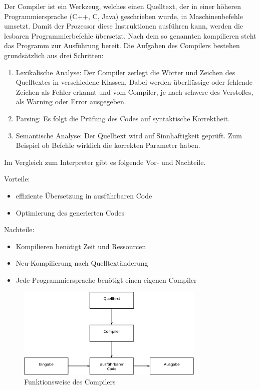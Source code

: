 Der Compiler ist ein Werkzeug, welches einen Quelltext, der in einer höheren Programmiersprache (C++, C, Java) geschrieben wurde, in Maschinenbefehle umsetzt. Damit der Prozessor diese Instruktionen ausführen kann, werden die lesbaren Programmierbefehle übersetzt. Nach dem so genannten kompilieren steht das Programm zur Ausführung bereit.
Die Aufgaben des Compilers bestehen grundsätzlich aus drei Schritten:\cite{compiler}
\begin{enumerate}
  \item Lexikalische Analyse:
  	Der Compiler zerlegt die Wörter und Zeichen des Quelltextes in verschiedene Klassen. Dabei werden überflüssige oder fehlende Zeichen als Fehler erkannt und vom Compiler, je nach
  schwere des Verstoßes, als Warning oder Error ausgegeben.
  \item Parsing:
  	Es folgt die Prüfung des Codes auf syntaktische Korrektheit.
  \item Semantische Analyse: Der Quelltext wird auf Sinnhaftigkeit geprüft. Zum Beispiel ob Befehle wirklich die korrekten Parameter haben.
\end{enumerate}

Im Vergleich zum Interpreter gibt es folgende Vor- und Nachteile.

Vorteile:
\begin{itemize}
  \item effiziente Übersetzung in ausführbaren Code
  \item Optimierung des generierten Codes
\end{itemize}

Nachteile:
\begin{itemize}
  \item Kompilieren benötigt Zeit und Ressourcen
  \item Neu-Kompilierung nach Quelltextänderung
  \item Jede Programmiersprache benötigt einen eigenen Compiler
\end{itemize}

\begin{figure}[H]
\centering
\includegraphics[width=0.8\textwidth]{Hauptteil/Compiler.eps}
\caption{Funktionsweise des Compilers}\label{fig:compiler}
\end{figure}

